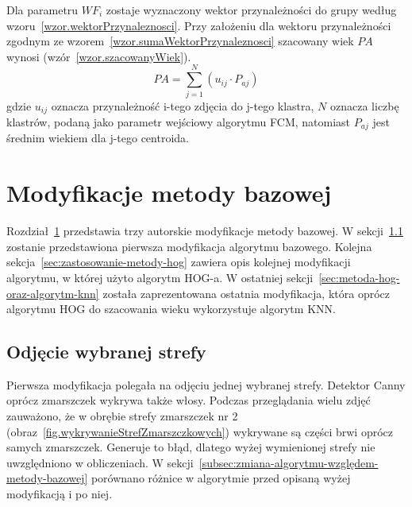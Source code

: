 \documentclass[a4paper,twoside,12pt]{book}
\begin{document}


    Dla parametru $WF_{i}$ zostaje wyznaczony wektor przynależności do grupy
    według wzoru~\ref{wzor.wektorPrzynaleznosci}.
    Przy założeniu dla wektoru przynależności zgodnym ze wzorem~\ref{wzor.sumaWektorPrzynaleznosci} szacowany wiek
    $PA$
    wynosi
    (wzór~\ref{wzor.szacowanyWiek}).
    \large
    \begin{equation}
        PA=\sum_{j=1}^{N}(u_{ij} \cdot P_{aj})
        \label{wzor.szacowanyWiek}
    \end{equation}
    \normalsize
    gdzie $u_{ij}$ oznacza przynależność i-tego zdjęcia do j-tego klastra, $N$ oznacza liczbę klastrów, podaną jako
    parametr wejściowy algorytmu FCM,
    natomiast $P_{aj}$ jest średnim wiekiem dla j-tego centroida.

    \chapter{Modyfikacje metody bazowej}\label{ch:modyfikacje-metody-bazowej}
    Rozdział~\ref{ch:modyfikacje-metody-bazowej} przedstawia trzy autorskie modyfikacje metody bazowej.
    W sekcji~\ref{sec:odjęcie-wybranej-strefy} zostanie przedstawiona pierwsza modyfikacja algorytmu bazowego.
    Kolejna sekcja~\ref{sec:zastosowanie-metody-hog} zawiera opis kolejnej modyfikacji algorytmu, w której użyto
    algorytm HOG-a.
    W ostatniej sekcji~\ref{sec:metoda-hog-oraz-algorytm-knn} została zaprezentowana ostatnia modyfikacja, która oprócz algorytmu HOG do szacowania
    wieku wykorzystuje algorytm KNN.

    \section{Odjęcie wybranej strefy}\label{sec:odjęcie-wybranej-strefy}
    Pierwsza modyfikacja polegała na odjęciu jednej wybranej strefy. Detektor Canny oprócz zmarszczek
    wykrywa także włosy. Podczas przeglądania wielu zdjęć zauważono, że w obrębie
    strefy zmarszczek nr 2 (obraz~\ref{fig.wykrywanieStrefZmarszczkowych}) wykrywane są części brwi oprócz samych
    zmarszczek. Generuje to błąd, dlatego wyżej wymienionej strefy nie uwzględniono w obliczeniach.
    W sekcji~\ref{subsec:zmiana-algorytmu-względem-metody-bazowej} porównano różnice w algorytmie przed opisaną wyżej
    modyfikacją i po niej.
\end{document}
